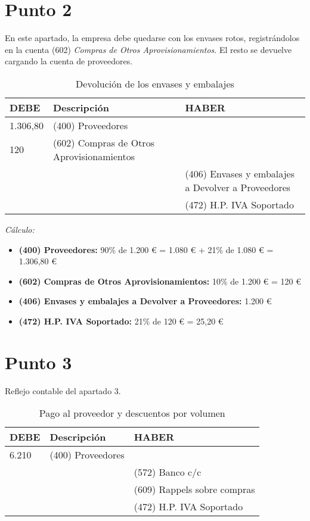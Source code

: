 \documentclass{article}
\begin{document}
\section*{Punto 2}

En este apartado, la empresa debe quedarse con los envases rotos, registrándolos en la cuenta (602) \textit{Compras de Otros Aprovisionamientos}. El resto se devuelve cargando la cuenta de proveedores.

\begin{table}[H]
\centering
\begin{tabular}{|p{4cm}|p{4cm}|p{4cm}|}
\hline
\textbf{DEBE} & \textbf{Descripción} & \textbf{HABER} \\
\hline
1.306,80 & (400) Proveedores & \\
120 & (602) Compras de Otros Aprovisionamientos & \\
& & (406) Envases y embalajes a Devolver a Proveedores \\
& & (472) H.P. IVA Soportado \\
\hline
\end{tabular}
\caption{Devolución de los envases y embalajes}
\end{table}

\textit{Cálculo:}
\begin{itemize}
    \item \textbf{(400) Proveedores:} 90\% de 1.200 € = 1.080 € + 21\% de 1.080 € = 1.306,80 €
    \item \textbf{(602) Compras de Otros Aprovisionamientos:} 10\% de 1.200 € = 120 €
    \item \textbf{(406) Envases y embalajes a Devolver a Proveedores:} 1.200 €
    \item \textbf{(472) H.P. IVA Soportado:} 21\% de 120 € = 25,20 €
\end{itemize}

\section*{Punto 3}

Reflejo contable del apartado 3.

\begin{table}[H]
\centering
\begin{tabular}{|p{4cm}|p{4cm}|p{4cm}|}
\hline
\textbf{DEBE} & \textbf{Descripción} & \textbf{HABER} \\
\hline
6.210 & (400) Proveedores & \\
& & (572) Banco c/c \\
& & (609) Rappels sobre compras \\
& & (472) H.P. IVA Soportado \\
\hline
\end{tabular}
\caption{Pago al proveedor y descuentos por volumen}
\end{table}
\end{document}
